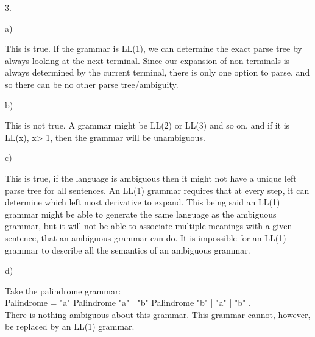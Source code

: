 \documentclass[a4paper,12pt]{article}
\newcommand\block[1]{\hspace*{#1}}
\newlength{\QNo}
\begin{document}
3. 
\begin{minipage}[t]{0.95\dimexpr\textwidth}
  a)
  \begin{minipage}[t]{0.9\dimexpr\textwidth}
This is true. If the grammar is LL(1), we can determine the exact parse tree by always looking at the next terminal. 
Since our expansion of non-terminals is always determined by the current terminal, there is only one option to parse, and so there can be no other parse tree/ambiguity.\\
  \end{minipage}

  b)
  \begin{minipage}[t]{0.9\dimexpr\textwidth-\QNo}
This is not true. A grammar might be LL(2) or LL(3) and so on, and if it is LL(x), x> 1, then the grammar will be unambiguous.\\
  \end{minipage}

  c)
  \begin{minipage}[t]{0.9\dimexpr\textwidth-\QNo}
    This is true, if the language is ambiguous then it might not have a unique left parse tree for all sentences.
    An LL(1) grammar requires that at every step, it can determine which left most derivative to expand.
    This being said an LL(1) grammar might be able to generate the same language as the ambiguous grammar, but it will not be able to associate multiple meanings with a given sentence, that an ambiguous grammar can do.
    It is impossible for an LL(1) grammar to describe all the semantics of an ambiguous grammar.\\
  \end{minipage}

  d)
  \begin{minipage}[t]{0.9\dimexpr\textwidth-\QNo}
    Take the palindrome grammar:\\
    \block{1cm}	Palindrome = "a" Palindrome "a" | "b" Palindrome "b" | "a" | "b" .\\
   There is nothing ambiguous about this grammar. This grammar cannot, however, be replaced by an LL(1) grammar.\\
  \end{minipage}
\end{minipage}
\end{document}
